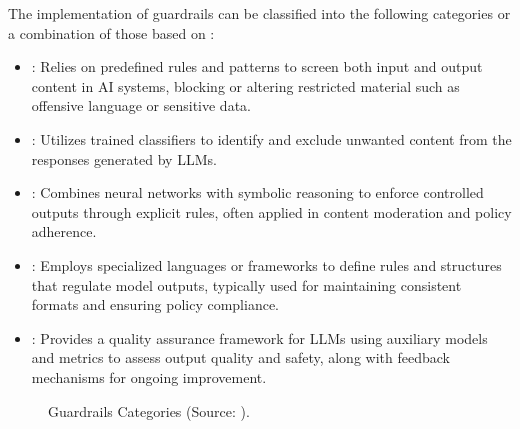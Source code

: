 \documentclass[letterpaper,11pt,english]{sphinxmanual}
\begin{document}
\sphinxAtStartPar
The implementation of guardrails can be classified into the following
categories or a combination of those based on :
\begin{itemize}
\item {} 
\sphinxAtStartPar
{}: Relies on predefined rules
and patterns to screen both input and output content in AI systems,
blocking or altering restricted material such as offensive language or
sensitive data.

\item {} 
\sphinxAtStartPar
{}: Utilizes trained
classifiers to identify and exclude unwanted content from the
responses generated by LLMs.

\item {} 
\sphinxAtStartPar
{}: Combines neural networks with symbolic
reasoning to enforce controlled outputs through explicit rules, often
applied in content moderation and policy adherence.

\item {} 
\sphinxAtStartPar
{}: Employs specialized
languages or frameworks to define rules and structures that regulate
model outputs, typically used for maintaining consistent formats and
ensuring policy compliance.

\item {} 
\sphinxAtStartPar
{}: Provides a quality assurance
framework for LLMs using auxiliary models and metrics to assess output
quality and safety, along with feedback mechanisms for ongoing
improvement.

\end{itemize}

\begin{figure}[htbp]
\centering
\capstart

\noindent{}
\caption{Guardrails Categories (Source: ).}\label{\detokenize{guardrails:id6}}\end{figure}
\end{document}
